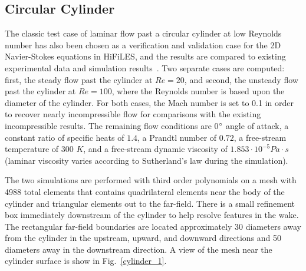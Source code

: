 \graphicspath{{figures_cylinder/}}%

\subsection{Circular Cylinder}

The classic test case of laminar flow past a circular cylinder at low Reynolds number has also been chosen as a verification and validation case for the 2D Navier-Stokes equations in HiFiLES, and the results are compared to existing experimental data and simulation results~\cite{park1998}. Two separate cases are computed: first, the steady flow past the cylinder at $Re = 20$, and second, the unsteady flow past the cylinder at $Re = 100$, where the Reynolds number is based upon the diameter of the cylinder. For both cases, the Mach number is set to 0.1 in order to recover nearly incompressible flow for comparisons with the existing incompressible results. The remaining flow conditions are 0$^{\circ}$ angle of attack, a constant ratio of specific heats of $1.4$, a Prandtl number of $0.72$, a free-stream temperature of 300 $K$, and a free-stream dynamic viscosity of $1.853\cdot 10^{-5} Pa \cdot s$ (laminar viscosity varies according to Sutherland's law during the simulation).

The two simulations are performed with third order polynomials on a mesh with 4988 total elements that contains quadrilateral elements near the body of the cylinder and triangular elements out to the far-field. There is a small refinement box immediately downstream of the cylinder to help resolve features in the wake. The rectangular far-field boundaries are located approximately 30 diameters away from the cylinder in the upstream, upward, and downward directions and 50 diameters away in the downstream direction. A view of the mesh near the cylinder surface is show in Fig.~\ref{cylinder_1}.

